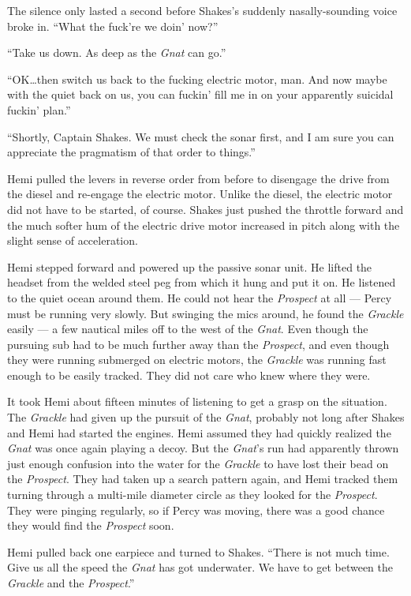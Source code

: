 \documentclass[
]{scrbook}
\begin{document}
The silence only lasted a second before Shakes's suddenly
nasally-sounding voice broke in. ``What the fuck're we doin' now?''

``Take us down. As deep as the \emph{Gnat} can go.''

``OK\ldots then switch us back to the fucking electric motor, man. And
now maybe with the quiet back on us, you can fuckin' fill me in on your
apparently suicidal fuckin' plan.''

``Shortly, Captain Shakes. We must check the sonar first, and I am sure
you can appreciate the pragmatism of that order to things.''

Hemi pulled the levers in reverse order from before to disengage the
drive from the diesel and re-engage the electric motor. Unlike the
diesel, the electric motor did not have to be started, of course. Shakes
just pushed the throttle forward and the much softer hum of the electric
drive motor increased in pitch along with the slight sense of
acceleration.

Hemi stepped forward and powered up the passive sonar unit. He lifted
the headset from the welded steel peg from which it hung and put it on.
He listened to the quiet ocean around them. He could not hear the
\emph{Prospect} at all --- Percy must be running very slowly. But
swinging the mics around, he found the \emph{Grackle} easily --- a few
nautical miles off to the west of the \emph{Gnat}. Even though the
pursuing sub had to be much further away than the \emph{Prospect}, and
even though they were running submerged on electric motors, the
\emph{Grackle} was running fast enough to be easily tracked. They did
not care who knew where they were.

It took Hemi about fifteen minutes of listening to get a grasp on the
situation. The \emph{Grackle} had given up the pursuit of the
\emph{Gnat}, probably not long after Shakes and Hemi had started the
engines. Hemi assumed they had quickly realized the \emph{Gnat} was once
again playing a decoy. But the \emph{Gnat}'s run had apparently thrown
just enough confusion into the water for the \emph{Grackle} to have lost
their bead on the \emph{Prospect}. They had taken up a search pattern
again, and Hemi tracked them turning through a multi-mile diameter
circle as they looked for the \emph{Prospect}. They were pinging
regularly, so if Percy was moving, there was a good chance they would
find the \emph{Prospect} soon.

Hemi pulled back one earpiece and turned to Shakes. ``There is not much
time. Give us all the speed the \emph{Gnat} has got underwater. We have
to get between the \emph{Grackle} and the \emph{Prospect}.''
\end{document}
